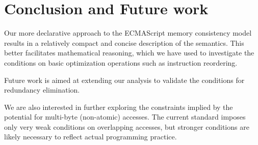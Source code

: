\section{Conclusion and Future work}
Our more declarative approach to the ECMAScript memory consistency model results in a relatively compact and concise description of the semantics.
This better facilitates mathematical reasoning, which we have used to investigate the conditions on basic optimization operations such as instruction reordering.

Future work is aimed at extending our analysis to validate the conditions for redundancy elimination.

We are also interested in further exploring the constraints implied by the potential for multi-byte (non-atomic) accesses.  The current standard imposes only very weak conditions on overlapping accesses, but stronger conditions are likely necessary to reflect actual programming practice.
